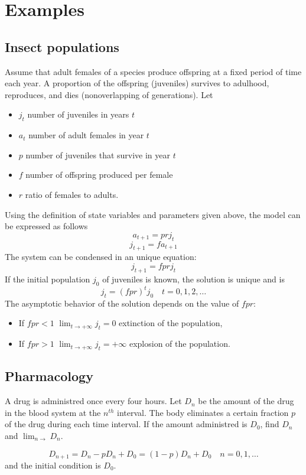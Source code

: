 \section{Examples}

\subsection{Insect populations}
Assume that adult females of a species produce offspring at a fixed period of time each year. A proportion of the offspring (juveniles) survives to adulhood, reproduces, and dies (nonoverlapping of generations). Let
\begin{itemize}
\item $j_t$ number of juveniles in years $t$
\item $a_t$ number of adult females in year $t$
\item $p$ number of juveniles that survive in year $t$
\item $f$ number of offspring produced per female
\item $r$ ratio of females to adults.
\end{itemize}
Using the definition of state variables and parameters given above, the model can be expressed as follows
$$a_{t+1}=prj_t$$
$$j_{t+1}=f a_{t+1}$$
The system can be condensed in an unique equation:
$$j_{t+1}=f prj_t$$
If the initial population $j_0$ of juveniles is known, the solution is unique and is
$$j_t=(f pr)^tj_0 \quad t=0,1,2,\dots$$
The asymptotic behavior of the solution depends on the value of $f pr$:
\begin{itemize}
\item If $f pr<1$ $\lim_{t\rightarrow +\infty} j_t=0$ extinction of the population,
\item If $f pr>1$ $\lim_{t\rightarrow +\infty} j_t=+\infty$ explosion of the population.
\end{itemize}
\subsection{Pharmacology}
A drug is administred once every four hours. Let $D_n$ be the amount of the drug in the blood system at the $n^{th}$ interval.  The body eliminates a certain fraction $p$ of the drug during each time interval. If the amount administred is $D_0$, find $D_n$ and $\lim _{n \rightarrow}D_{n}$.

$$D_{n+1}=D_n-pD_n +D_0=(1-p)D_n +D_0 \quad n=0,1,\dots$$
and the initial condition is $D_0$.

